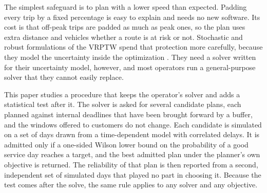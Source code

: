 \documentclass{itor}
\begin{document}
The simplest safeguard is to plan with a lower speed than expected. Padding every trip by a fixed percentage is easy to explain and needs no
new software. Its cost is that off-peak trips are padded as much as peak ones,
so the plan uses extra distance and vehicles whether a route is at risk or not.
Stochastic and robust formulations of the VRPTW spend that protection more
carefully, because they model the uncertainty inside the optimization
\citep{errico2018,agra2013,gendreau2016}. They need a solver written for their
uncertainty model, however, and most operators run a general-purpose solver
that they cannot easily replace.

This paper studies a procedure that keeps the operator's solver and adds a
statistical test after it. The solver is asked for several candidate plans,
each planned against internal deadlines that have been brought forward by a
buffer, and the windows offered to customers do not change. Each candidate is
simulated on a set of days drawn from a time-dependent model with correlated
delays. It is admitted only if a one-sided Wilson lower bound on the
probability of a good service day reaches a target, and the best admitted plan
under the planner's own objective is returned. The reliability of that plan is
then reported from a second, independent set of simulated days that played no
part in choosing it. Because the test comes after the solve, the same rule
applies to any solver and any objective.
\end{document}
